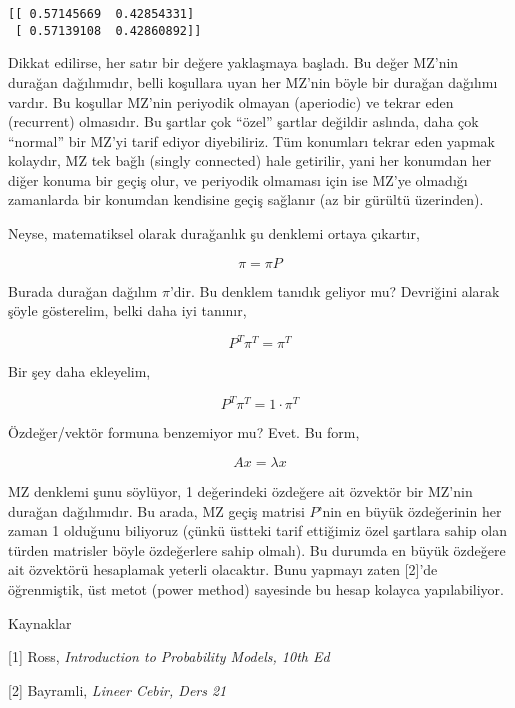 \documentclass[12pt,fleqn]{article}\usepackage{../../common}
\begin{document}
\begin{verbatim}
[[ 0.57145669  0.42854331]
 [ 0.57139108  0.42860892]]
\end{verbatim}

Dikkat edilirse, her satır bir değere yaklaşmaya başladı. Bu değer MZ'nin
durağan dağılımıdır, belli koşullara uyan her MZ'nin böyle bir durağan
dağılımı vardır. Bu koşullar MZ'nin periyodik olmayan (aperiodic) ve tekrar
eden (recurrent) olmasıdır. Bu şartlar çok ``özel'' şartlar değildir
aslında, daha çok ``normal'' bir MZ'yi tarif ediyor diyebiliriz. Tüm
konumları tekrar eden yapmak kolaydır, MZ tek bağlı (singly connected) hale
getirilir, yani her konumdan her diğer konuma bir geçiş olur, ve periyodik
olmaması için ise MZ'ye olmadığı zamanlarda bir konumdan kendisine geçiş
sağlanır (az bir gürültü üzerinden). 

Neyse, matematiksel olarak durağanlık şu denklemi ortaya çıkartır,

$$ \pi = \pi P $$

Burada durağan dağılım $\pi$'dir. Bu denklem tanıdık geliyor mu?  Devriğini
alarak şöyle gösterelim, belki daha iyi tanınır, 

$$ P^T\pi^T = \pi^T $$

Bir şey daha ekleyelim, 

$$ P^T\pi^T = 1 \cdot \pi^T $$

Özdeğer/vektör formuna benzemiyor mu? Evet. Bu form,

$$ Ax = \lambda x $$

MZ denklemi şunu söylüyor, 1 değerindeki özdeğere ait özvektör bir MZ'nin
durağan dağılımıdır. Bu arada, MZ geçiş matrisi $P$'nin en büyük özdeğerinin her
zaman 1 olduğunu biliyoruz (çünkü üstteki tarif ettiğimiz özel şartlara sahip
olan türden matrisler böyle özdeğerlere sahip olmalı). Bu durumda en büyük
özdeğere ait özvektörü hesaplamak yeterli olacaktır. Bunu yapmayı zaten [2]'de
öğrenmiştik, üst metot (power method) sayesinde bu hesap kolayca yapılabiliyor.



Kaynaklar

[1] Ross, {\em Introduction to Probability Models, 10th Ed}

[2] Bayramli, {\em Lineer Cebir, Ders 21}
\end{document}
